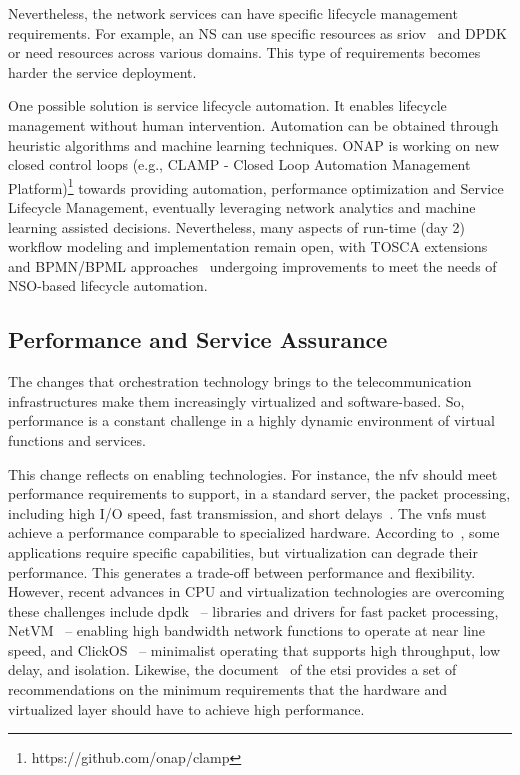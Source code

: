 Nevertheless, the network services can have specific lifecycle management requirements. For example, an NS can use specific resources as \gls{sriov}~\cite{5416637} and DPDK or need resources across various domains. This type of requirements becomes harder the service deployment.

One possible solution is service lifecycle automation. It enables lifecycle management without human intervention. Automation can be obtained through heuristic algorithms and machine learning techniques. ONAP is working on new closed control loops (e.g., CLAMP - Closed Loop Automation Management Platform)\footnote{https://github.com/onap/clamp} towards providing automation, performance optimization and Service Lifecycle Management, eventually leveraging network analytics and machine learning assisted decisions.
Nevertheless, many aspects of run-time (day 2) workflow modeling and implementation remain open, with TOSCA extensions and BPMN/BPML approaches~\cite{DBLP:conf/closer/CalcaterraCMT17} undergoing improvements to meet the needs of NSO-based lifecycle automation. 


\subsection{Performance and  Service Assurance}

The changes that orchestration technology brings to the telecommunication infrastructures make them increasingly virtualized and software-based. So, performance is a constant challenge in a highly dynamic environment of virtual functions and services.  

This change reflects on enabling technologies. For instance, the \gls{nfv} should meet performance requirements to support, in a standard server, the packet processing, including high I/O speed, fast transmission, and short delays~\cite{YongLi2015Software-DefinedSurvey}. The \glspl{vnf} must achieve a performance comparable to specialized hardware. According to~\cite{Mijumbi2016NetworkChallenges}, some applications require specific capabilities, but virtualization can degrade their performance. This generates a trade-off between performance and flexibility. However, recent advances in CPU and virtualization technologies are overcoming these challenges include \gls{dpdk}~\cite{LinuxFoundationDPDKKit} -- libraries and drivers for fast packet processing, NetVM~\cite{7036139} -- enabling high bandwidth network functions to operate at near line speed, and ClickOS~\cite{Martins:2014:CAN:2616448.2616491} -- minimalist operating that supports high throughput, low delay, and isolation. Likewise, the document~\cite{ETSIGSPractises} of the \gls{etsi}  provides a set of recommendations on the minimum requirements that the hardware and virtualized layer should have to achieve high performance.

